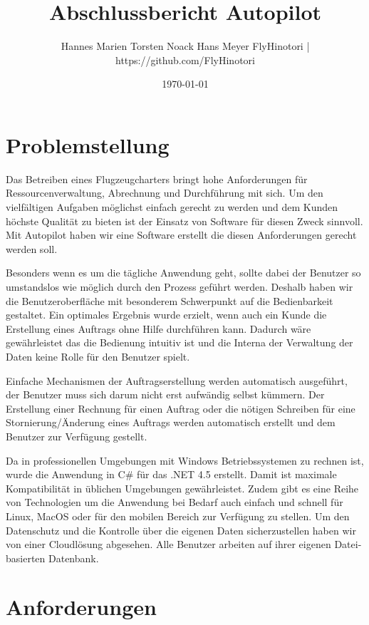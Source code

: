 \documentclass[12pt]{article}
\title{Abschlussbericht Autopilot}
\author{Hannes Marien \newline Torsten Noack \newline Hans Meyer \newline FlyHinotori | https://github.com/FlyHinotori}
\date{\today}
\begin{document}
\maketitle

\tableofcontents
\clearpage

\section{Problemstellung}

Das Betreiben eines Flugzeugcharters bringt hohe Anforderungen für Ressourcenverwaltung, Abrechnung und Durchführung mit sich. Um den vielfältigen Aufgaben möglichst einfach gerecht zu werden und dem Kunden höchste Qualität zu bieten ist der Einsatz von Software für diesen Zweck sinnvoll. Mit Autopilot haben wir eine Software erstellt die diesen Anforderungen gerecht werden soll.
\newline

Besonders wenn es um die tägliche Anwendung geht, sollte dabei der Benutzer so umstandslos wie möglich durch den Prozess geführt werden. Deshalb haben wir die Benutzeroberfläche mit besonderem Schwerpunkt auf die Bedienbarkeit gestaltet. Ein optimales Ergebnis wurde erzielt, wenn auch ein Kunde die Erstellung eines Auftrags ohne Hilfe durchführen kann. Dadurch wäre gewährleistet das die Bedienung intuitiv ist und die Interna der Verwaltung der Daten keine Rolle für den Benutzer spielt.
\newline

Einfache Mechanismen der Auftragserstellung werden automatisch ausgeführt, der Benutzer muss sich darum nicht erst aufwändig selbst kümmern. Der Erstellung einer Rechnung für einen Auftrag oder die nötigen Schreiben für eine Stornierung/Änderung eines Auftrags werden automatisch erstellt und dem Benutzer zur Verfügung gestellt.
\newline

Da in professionellen Umgebungen mit Windows Betriebssystemen zu rechnen ist, wurde die Anwendung in C\# für das .NET 4.5 erstellt. Damit ist maximale Kompatibilität in üblichen Umgebungen gewährleistet. Zudem gibt es eine Reihe von Technologien um die Anwendung bei Bedarf auch einfach und schnell für Linux, MacOS oder für den mobilen Bereich zur Verfügung zu stellen. Um den Datenschutz und die Kontrolle über die eigenen Daten sicherzustellen haben wir von einer Cloudlösung abgesehen. Alle Benutzer arbeiten auf ihrer eigenen Datei-basierten Datenbank.

\newpage
\section{Anforderungen}
\end{document}
